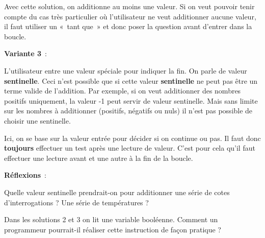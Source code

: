 		Avec cette solution, on additionne au moins une valeur. 
		Si on veut pouvoir tenir compte du
		cas très particulier où l'utilisateur ne veut
		additionner aucune valeur, il faut utiliser un «~tant que~» et donc
		poser la question avant d'entrer dans la boucle.


		\medskip
		\textbf{Variante 3}~:
		
		L'utilisateur entre une valeur spéciale pour indiquer la fin. 
		On parle de valeur \textbf{sentinelle}. 
		Ceci n'est possible que si cette valeur \textbf{sentinelle} ne peut pas être
		un terme valide de l'addition. Par exemple, si on veut
		additionner des nombres positifs uniquement, la valeur -1 peut servir
		de valeur sentinelle. Mais sans limite sur les nombres à additionner
		(positifs, négatifs ou nuls) il n'est pas possible de
		choisir une sentinelle.

		Ici, on se base sur la valeur entrée pour décider si on continue ou pas. 
		Il faut donc \textbf{toujours} effectuer un test
		après une lecture de valeur. C'est pour cela
		qu'il faut effectuer une lecture avant et une autre à
		la fin de la boucle.


		\textbf{Réflexions}~: 
		\begin{liste}
		\item
			Quelle valeur sentinelle prendrait-on 
			pour additionner une série de cotes d'interrogations ? 
			Une série de températures ?
		\item
			Dans les solutions 2 et 3 on lit une variable booléenne. 
			Comment un programmeur pourrait-il réaliser 
			cette instruction de façon pratique ?		
		\end{liste}
		
